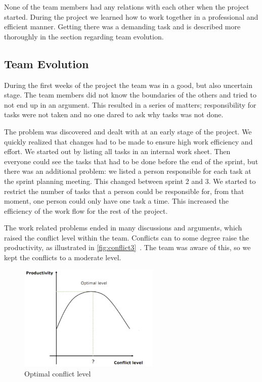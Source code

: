 None of the team members had any relations with each other when the project started. During the project we learned how to work together in a professional and efficient manner. Getting there was a demanding task and is described more thoroughly in the section regarding team evolution.

\subsection{Team Evolution}
During the first weeks of the project the team was in a good, but also uncertain stage. The team members did not know the boundaries of the others and tried to not end up in an argument. This resulted in a series of matters; responsibility for tasks were not taken and no one dared to ask why tasks was not done.

The problem was discovered and dealt with at an early stage of the project. We quickly realized that changes had to be made to ensure high work efficiency and effort. We started out by listing all tasks in an internal work sheet. Then everyone could see the tasks that had to be done before the end of the sprint, but there was an additional problem: we listed a person responsible for each task at the sprint planning meeting. This changed between sprint 2 and 3. We started to restrict the number of tasks that a person could be responsible for, from that moment, one person could only have one task a time. This increased the efficiency of the work flow for the rest of the project.

The work related problems ended in many discussions and arguments, which raised the conflict level within the team. Conflicts can to some degree raise the productivity, as illustrated in \autoref{fig:conflict3}~\cite{favio}. The team was aware of this, so we kept the conflicts to a moderate level.
\begin{figure}[htb]
	\center
	\includegraphics[width=0.6\textwidth]{./evaluation/img/conflict3}
	\caption{Optimal conflict level \label{fig:conflict3}}
\end{figure}

